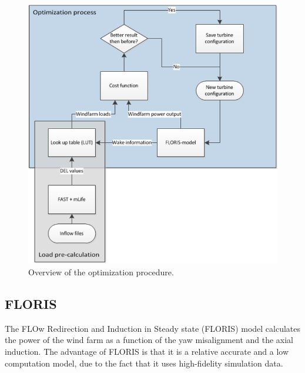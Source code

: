	\begin{figure}
		\includegraphics[width=\linewidth]{./Figures/OptimizationProcess.png}
		\caption{Overview of the optimization procedure.}
		\label{fig:optim}
	\end{figure}


  


\subsection{FLORIS} The FLOw Redirection and Induction in Steady state (FLORIS) model calculates the power of the wind farm as a function of the yaw misalignment and the axial induction. \cite{Gebraad2013}
The advantage of FLORIS is that it is a relative accurate\cite{Dijk2016} and a low computation model, due to the fact that it uses high-fidelity simulation data. 

